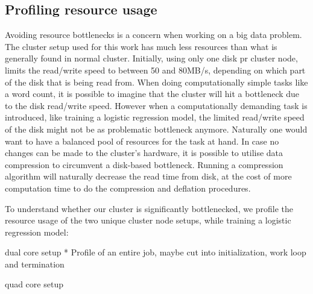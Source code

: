 \subsection{Profiling resource usage}\label{sec:profile}

Avoiding resource bottlenecks is a concern when working on a big data problem. 
The cluster setup used for this work has much less resources than what is generally found in normal cluster. 
Initially, using only one disk pr cluster node, limits the read/write speed to between 50 and 80MB/s, depending on which part of the disk that is being read from. 
When doing computationally simple tasks like a word count, it is possible to imagine that the cluster will hit a bottleneck due to the disk read/write speed. 
However when a computationally demanding task is introduced, like training a logistic regression model, the limited read/write speed of the disk might not be as problematic bottleneck anymore. %
Naturally one would want to have a balanced pool of resources for the task at hand. 
In case no changes can be made to the cluster's hardware, it is possible to utilise data compression to circumvent a disk-based bottleneck. 
Running a compression algorithm will naturally decrease the read time from disk, at the cost of more computation time to do the compression and deflation procedures.

To understand whether our cluster is significantly bottlenecked, we profile the resource usage of the two unique cluster node setups, while training a logistic regression model:

dual core setup
* Profile of an entire job, maybe cut into initialization, work loop and termination

quad core setup
